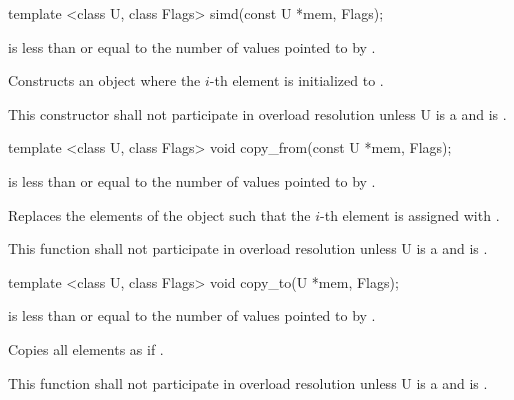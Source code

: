 \begin{itemdecl}
template <class U, class Flags> simd(const U *mem, Flags);
\end{itemdecl}
\begin{itemdescr}
   is less than or equal to the number of values pointed to by .

  \pnum\effects Constructs an object where the $i$-th element is initialized to  \foralli.

  \pnum\remarks This constructor shall not participate in overload resolution unless \type U is a \realArithmeticType and  is \true.
\end{itemdescr}

\begin{itemdecl}
template <class U, class Flags> void copy_from(const U *mem, Flags);
\end{itemdecl}
\begin{itemdescr}
   is less than or equal to the number of values pointed to by .

  \pnum\effects Replaces the elements of the \simd object such that the $i$-th element is assigned with  \foralli.

  \pnum\remarks This function shall not participate in overload resolution unless \type U is a \realArithmeticType and  is \true.
\end{itemdescr}

\begin{itemdecl}
template <class U, class Flags> void copy_to(U *mem, Flags);
\end{itemdecl}
\begin{itemdescr}
   is less than or equal to the number of values pointed to by .

  \pnum\effects Copies all \simd elements as if  \foralli.

  \pnum\remarks This function shall not participate in overload resolution unless \type U is a \realArithmeticType and  is \true.
\end{itemdescr}

